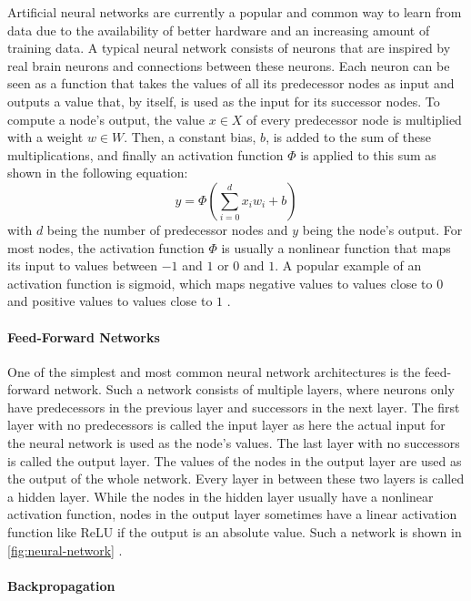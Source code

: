Artificial neural networks are currently a popular and common way to learn from data due to the availability of better hardware and an increasing amount of training data.
A typical neural network consists of neurons that are inspired by real brain neurons and connections between these neurons.
Each neuron can be seen as a function that takes the values of all its predecessor nodes as input and outputs a value that, by itself, is used as the input for its successor nodes.
To compute a node's output, the value $x \in X$ of every predecessor node is multiplied with a weight $w \in W$.
Then, a constant bias, $b$, is added to the sum of these multiplications, and finally an activation function $\Phi$ is applied to this sum as shown in the following equation:
\[
	y = \Phi(\sum_{i=0}^{d}x_iw_i + b)
\]
with $d$ being the number of predecessor nodes and $y$ being the node's output.
For most nodes, the activation function $\Phi$ is usually a nonlinear function that maps its input to values between $-1$ and $1$ or $0$ and $1$.
A popular example of an activation function is sigmoid, which maps negative values to values close to $0$ and positive values to values close to $1$ \cite[p.~4--13]{Aggarwal2018}.

\paragraph{Feed-Forward Networks}

One of the simplest and most common neural network architectures is the feed-forward network.
Such a network consists of multiple layers, where neurons only have predecessors in the previous layer and successors in the next layer.
The first layer with no predecessors is called the input layer as here the actual input for the neural network is used as the node's values.
The last layer with no successors is called the output layer.
The values of the nodes in the output layer are used as the output of the whole network.
Every layer in between these two layers is called a hidden layer.
While the nodes in the hidden layer usually have a nonlinear activation function, nodes in the output layer sometimes have a linear activation function like ReLU if the output is an absolute value. 
Such a network is shown in \cref{fig:neural-network} \cite[p.~17--20]{Aggarwal2018}.

\paragraph{Backpropagation}

